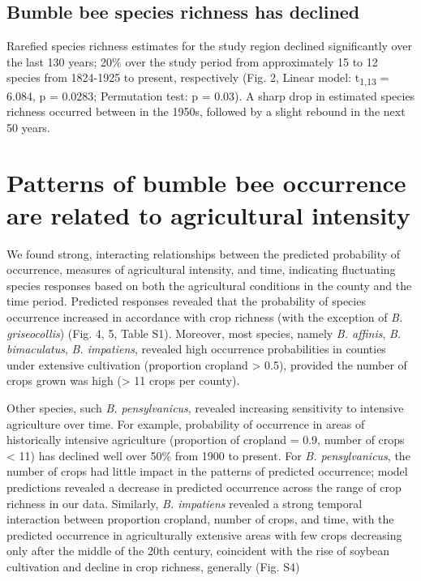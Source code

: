 \documentclass[11pt,]{article}
\begin{document}
\hypertarget{bumble-bee-species-richness-has-declined}{%
\subsection{Bumble bee species richness has
declined}\label{bumble-bee-species-richness-has-declined}}

Rarefied species richness estimates for the study region declined
significantly over the last 130 years; 20\% over the study period from
approximately 15 to 12 species from 1824-1925 to present, respectively
(Fig. 2, Linear model: t\textsubscript{1,13} = 6.084, p = 0.0283;
Permutation test: p = 0.03). A sharp drop in estimated species richness
occurred between in the 1950s, followed by a slight rebound in the next
50 years.

\hypertarget{patterns-of-bumble-bee-occurrence-are-related-to-agricultural-intensity}{%
\section{Patterns of bumble bee occurrence are related to agricultural
intensity}\label{patterns-of-bumble-bee-occurrence-are-related-to-agricultural-intensity}}

We found strong, interacting relationships between the predicted
probability of occurrence, measures of agricultural intensity, and time,
indicating fluctuating species responses based on both the agricultural
conditions in the county and the time period. Predicted responses
revealed that the probability of species occurrence increased in
accordance with crop richness (with the exception of \emph{B.
griseocollis}) (Fig. 4, 5, Table S1). Moreover, most species, namely
\emph{B. affinis}, \emph{B. bimaculatus}, \emph{B. impatiens}, revealed
high occurrence probabilities in counties under extensive cultivation
(proportion cropland \textgreater{} 0.5), provided the number of crops
grown was high (\textgreater{} 11 crops per county).

Other species, such \emph{B. pensylvanicus}, revealed increasing
sensitivity to intensive agriculture over time. For example, probability
of occurrence in areas of historically intensive agriculture (proportion
of cropland = 0.9, number of crops \textless{} 11) has declined well
over 50\% from 1900 to present. For \emph{B. pensylvanicus}, the number
of crops had little impact in the patterns of predicted occurrence;
model predictions revealed a decrease in predicted occurrence across the
range of crop richness in our data. Similarly, \emph{B. impatiens}
revealed a strong temporal interaction between proportion cropland,
number of crops, and time, with the predicted occurrence in
agriculturally extensive areas with few crops decreasing only after the
middle of the 20th century, coincident with the rise of soybean
cultivation and decline in crop richness, generally (Fig. S4)
\end{document}
